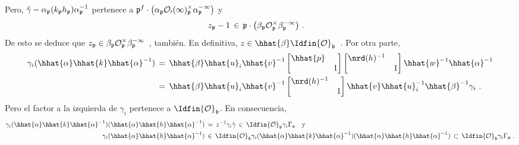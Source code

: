 %
Pero,
\begin{math}
	\tilde{\gamma}-\alpha_{\frak{p}} (k_{\frak{p}}h_{\frak{p}})
		\alpha_{\frak{p}}^{-1}
\end{math}
pertenece a
\begin{math}
	\frak{p}^{f}\cdot\big(\alpha_{\frak{p}}
		\cal{O}_{0}(1)^{\times}_{\frak{p}}
		\alpha_{\frak{p}}^{-1}\big)
\end{math}
y
\begin{align*}
	z_{\frak{p}}-1 & \,\in\,\frak{p}\cdot \big(
		\beta_{\frak{p}}\cal{O}^{\times}_{\frak{p}}
			\beta_{\frak{p}}^{-1}\big)
	\text{ .}
\end{align*}
%
De esto se deduce que
\begin{math}
	z_{\frak{p}}\in\beta_{\frak{p}}\cal{O}^{\times}_{\frak{p}}
		\beta_{\frak{p}}^{-1}
\end{math}~,
tambi\'{e}n. En definitiva,
\begin{math}
	z\in\hhat{\beta}\Idfin{\cal{O}}_{\frak{b}}
\end{math}~.
Por otra parte,
\begin{align*}
	\gamma_{i} (\hhat{\alpha}\hhat{k}\hhat{\alpha}^{-1})
	& \,=\,\hhat{\beta}\hhat{u}_{i} \hhat{v}^{-1}
		\begin{bmatrix}\hhat{p} & \\ & 1\end{bmatrix}
		\begin{bmatrix} \nrd(h)^{-1} & \\ & 1\end{bmatrix}
		\hhat{w}^{-1}\hhat{\alpha}^{-1} \\
	& \,=\,\hhat{\beta}\hhat{u}_{i}\hhat{v}^{-1}
		\begin{bmatrix} \nrd(h)^{-1} & \\ & 1\end{bmatrix}
		\hhat{v}\hhat{u}_{i}^{-1}\hhat{\beta}^{-1}
		\gamma_{i}
	\text{ .}
\end{align*}
%
Pero el factor a la izquierda de $\gamma_{i}$ pertenece a
$\Idfin{\cal{O}}_{\frak{b}}$. En consecuencia,
\begin{align*}
	\gamma_{i} (\hhat{\alpha}\hhat{k}\hhat{\alpha}^{-1})
		(\hhat{\alpha}\hhat{h}\hhat{\alpha}^{-1})
	& \,=\, z^{-1}\gamma_{i}\tilde{\gamma}\,\in\,
		\Idfin{\cal{O}}_{\frak{b}}\gamma_{i}\Gamma_{\frak{a}}
		\quad\text{y} \\
	\gamma_{i} (\hhat{\alpha}\hhat{h}\hhat{\alpha}^{-1})
	& \,\in\,\Idfin{\cal{O}}_{\frak{b}}\gamma_{i}
		(\hhat{\alpha}\hhat{k}\hhat{\alpha}^{-1})
		(\hhat{\alpha}\hhat{h}\hhat{\alpha}^{-1})
		\,\subset\,\Idfin{\cal{O}}_{\frak{b}}\gamma_{i}
			\Gamma_{\frak{a}}
	\text{ .}
\end{align*}
%

